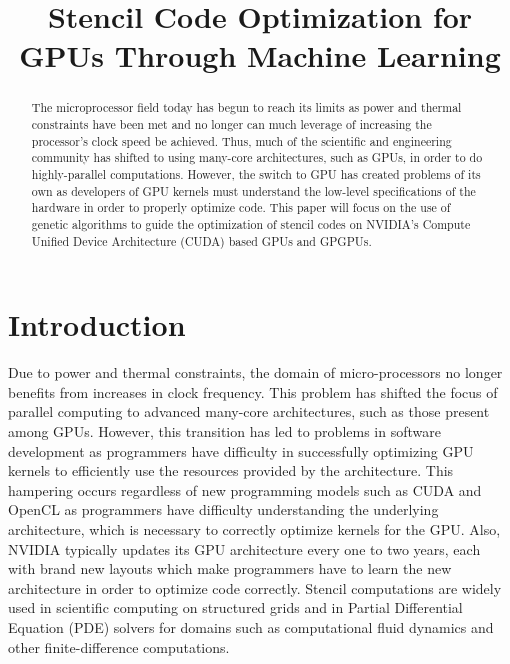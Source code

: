\documentclass[conference]{IEEEtran}
\begin{document}


\title{Stencil Code Optimization for GPUs Through Machine Learning}
\author{
}
\maketitle

\begin{abstract}
	The microprocessor field today has begun to reach its limits as power and thermal constraints have been met and no longer can much leverage of increasing the processor's clock speed be achieved. Thus, much of the scientific and engineering community has shifted to using many-core architectures, such as GPUs, in order to do highly-parallel computations. However, the switch to GPU has created problems of its own as developers of GPU kernels must understand the low-level specifications of the hardware in order to properly optimize code. This paper will focus on the use of genetic algorithms to guide the optimization of stencil codes on NVIDIA's Compute Unified Device Architecture (CUDA) based GPUs and GPGPUs.
\end{abstract}

\section{Introduction}
	Due to power and thermal constraints, the domain of micro-processors no longer benefits from increases in clock frequency\cite{Datta}. This problem has shifted the focus of parallel computing to advanced many-core architectures, such as those present among GPUs. However, this transition has led to problems in software development as programmers have difficulty in successfully optimizing GPU kernels to efficiently use the resources provided by the architecture. This hampering occurs regardless of new programming models such as CUDA and OpenCL as programmers have difficulty understanding the underlying architecture, which is necessary to correctly optimize kernels for the GPU\cite{Zhang}. Also, NVIDIA typically updates its GPU architecture every one to two years, each with brand new layouts which make programmers have to learn the new architecture in order to optimize code correctly. Stencil computations are widely used in scientific computing on structured grids and in Partial Differential Equation (PDE) solvers for domains such as computational fluid dynamics and other finite-difference computations\cite{Mici, Nguy, Jaeger, Datta, Gana, Zhang, NVIDIA}.
\end{document}
